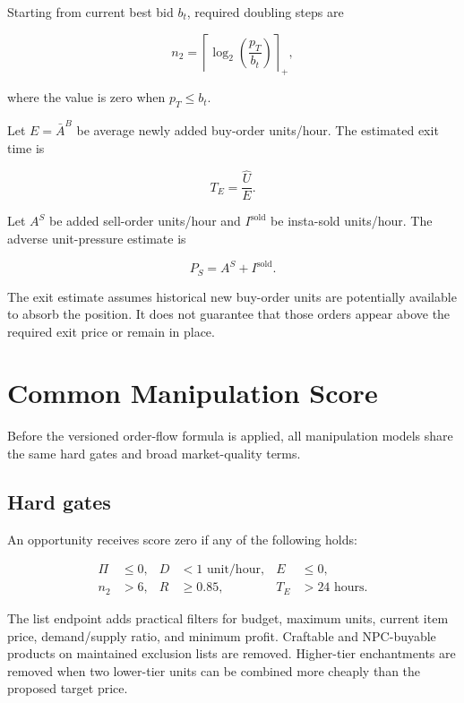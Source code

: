 \documentclass[11pt,a4paper]{article}
\begin{document}
Starting from current best bid $b_t$, required doubling steps are

\begin{equation}
n_2=\left\lceil\log_2\left(\frac{p_T}{b_t}\right)\right\rceil_+,
\end{equation}

where the value is zero when $p_T\le b_t$.

Let $E=\bar A^B$ be average newly added buy-order units/hour. The estimated exit time is

\begin{equation}
T_E=\frac{\widehat U}{E}.
\end{equation}

Let $A^S$ be added sell-order units/hour and $I^{\mathrm{sold}}$ be insta-sold units/hour.
The adverse unit-pressure estimate is

\begin{equation}
P_S=A^S+I^{\mathrm{sold}}.
\end{equation}

The exit estimate assumes historical new buy-order units are potentially available to absorb
the position. It does not guarantee that those orders appear above the required exit price or
remain in place.

\section{Common Manipulation Score}

Before the versioned order-flow formula is applied, all manipulation models share the same
hard gates and broad market-quality terms.

\subsection{Hard gates}

An opportunity receives score zero if any of the following holds:

\begin{align*}
\Pi&\le0,& D&<1\text{ unit/hour},& E&\le0,\\
n_2&>6,& R&\ge0.85,& T_E&>24\text{ hours}.
\end{align*}

The list endpoint adds practical filters for budget, maximum units, current item price,
demand/supply ratio, and minimum profit. Craftable and NPC-buyable products on maintained
exclusion lists are removed. Higher-tier enchantments are removed when two lower-tier units
can be combined more cheaply than the proposed target price.
\end{document}
